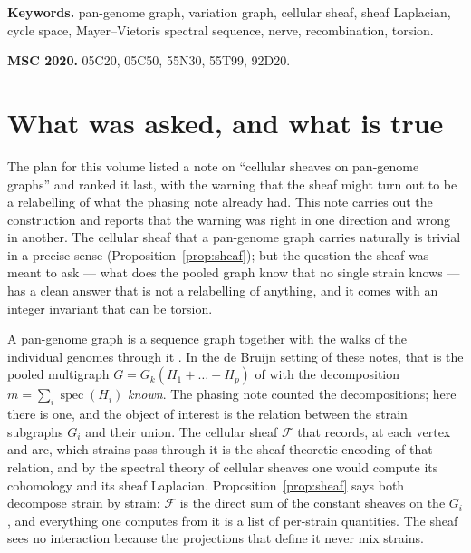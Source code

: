 \documentclass[11pt]{article}
\theoremstyle{plain}
\theoremstyle{definition}
\theoremstyle{remark}
\newcommand{\spec}{\operatorname{spec}}
\newcommand{\sheaf}{\mathcal{F}}
\begin{document}
\medskip
\noindent\textbf{Keywords.} pan-genome graph, variation graph, cellular sheaf, sheaf
Laplacian, cycle space, Mayer--Vietoris spectral sequence, nerve, recombination, torsion.

\noindent\textbf{MSC 2020.} 05C20, 05C50, 55N30, 55T99, 92D20.

\section{What was asked, and what is true}

The plan for this volume listed a note on ``cellular sheaves on pan-genome graphs'' and ranked
it last, with the warning that the sheaf might turn out to be a relabelling of what the
phasing note already had. This note carries out the construction and reports that the
warning was right in one direction and wrong in another. The cellular sheaf that a pan-genome
graph carries naturally is trivial in a precise sense (Proposition~\ref{prop:sheaf}); but
the question the sheaf was meant to ask --- what does the pooled graph know that no single
strain knows --- has a clean answer that is not a relabelling of anything, and it comes with
an integer invariant that can be torsion.

A pan-genome graph is a sequence graph together with the walks of the individual genomes
through it \cite{GSN18,EPN20}. In the de Bruijn setting of these notes, that is the pooled
multigraph $G=G_k(H_1{+}\dots{+}H_p)$ of \cite{Bio9} with the decomposition
$m=\sum_i\spec(H_i)$ \emph{known}. The phasing note counted the decompositions; here there is
one, and the object of interest is the relation between the strain subgraphs $G_i$ and their
union. The cellular sheaf $\sheaf$ that records, at each vertex and arc, which strains pass
through it is the sheaf-theoretic encoding of that relation, and by the spectral theory of
cellular sheaves \cite{HG19} one would compute its cohomology and its sheaf Laplacian.
Proposition~\ref{prop:sheaf} says both decompose strain by strain: $\sheaf$ is the direct sum
of the constant sheaves on the $G_i$, and everything one computes from it is a list of
per-strain quantities. The sheaf sees no interaction because the projections that define it
never mix strains.
\end{document}
